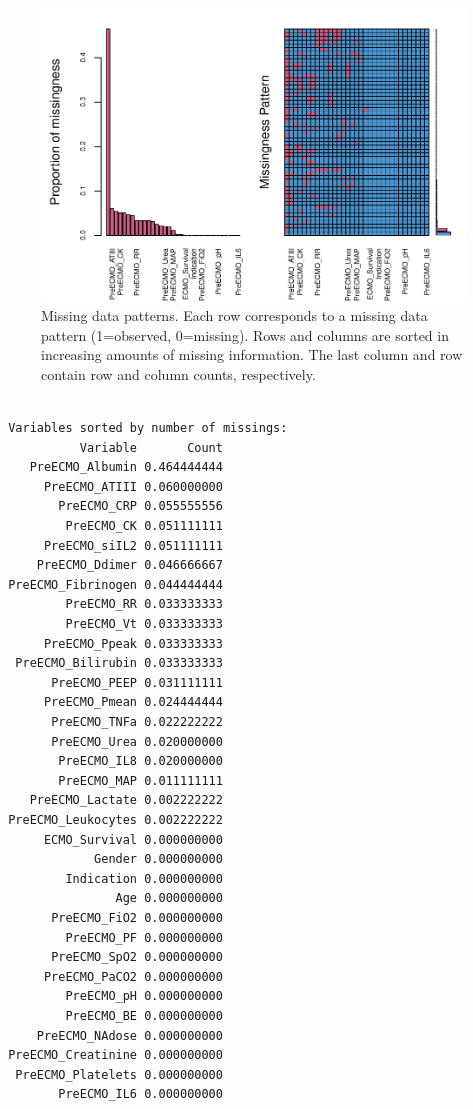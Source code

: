 \documentclass[12pt,]{article}
\begin{document}
\begin{figure}[H]

{\centering \includegraphics[width=1\linewidth]{figure/graphics-unnamed-chunk-8-1} 

}

\caption{\label{fig.missing-data-patterns}Missing data patterns.  Each row corresponds to a missing data pattern (1=observed, 0=missing).  Rows and columns are sorted in increasing amounts of missing information.  The last column and row contain row and column counts, respectively.}\label{fig:unnamed-chunk-8}
\end{figure}

\begin{verbatim}

 Variables sorted by number of missings: 
           Variable       Count
    PreECMO_Albumin 0.464444444
      PreECMO_ATIII 0.060000000
        PreECMO_CRP 0.055555556
         PreECMO_CK 0.051111111
      PreECMO_siIL2 0.051111111
     PreECMO_Ddimer 0.046666667
 PreECMO_Fibrinogen 0.044444444
         PreECMO_RR 0.033333333
         PreECMO_Vt 0.033333333
      PreECMO_Ppeak 0.033333333
  PreECMO_Bilirubin 0.033333333
       PreECMO_PEEP 0.031111111
      PreECMO_Pmean 0.024444444
       PreECMO_TNFa 0.022222222
       PreECMO_Urea 0.020000000
        PreECMO_IL8 0.020000000
        PreECMO_MAP 0.011111111
    PreECMO_Lactate 0.002222222
 PreECMO_Leukocytes 0.002222222
      ECMO_Survival 0.000000000
             Gender 0.000000000
         Indication 0.000000000
                Age 0.000000000
       PreECMO_FiO2 0.000000000
         PreECMO_PF 0.000000000
       PreECMO_SpO2 0.000000000
      PreECMO_PaCO2 0.000000000
         PreECMO_pH 0.000000000
         PreECMO_BE 0.000000000
     PreECMO_NAdose 0.000000000
 PreECMO_Creatinine 0.000000000
  PreECMO_Platelets 0.000000000
        PreECMO_IL6 0.000000000
\end{verbatim}
\end{document}
